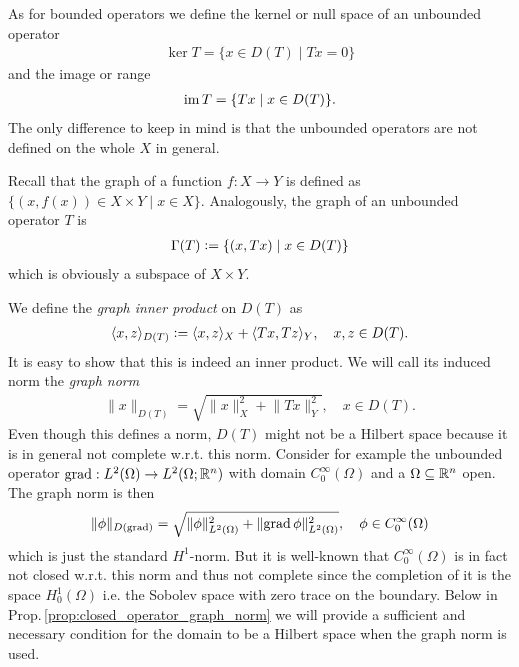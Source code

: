 \documentclass[../master_thesis.tex]{subfiles}
\begin{document}
As for bounded operators we define the kernel or null space of an unbounded
operator 
\begin{align*}
    \ker T = \{ x \in D(T) \mid Tx = 0\}
\end{align*}
and the image or range
\begin{align*}
    \operatorname{im} T = \{ Tx \mid x \in D(T)\}.
\end{align*}
The only difference to keep in mind is that the unbounded operators are not 
defined on the whole $X$ in general.

Recall that the graph of a function $f: X \rightarrow Y$ is defined 
as $\{ (x,f(x)) \in X \times Y \mid x \in X\}$. 
Analogously, the graph of an unbounded operator $T$ is 
\begin{align*}
    \Gamma(T) \vcentcolon= \{ (x,Tx) \mid x \in D(T) \}
\end{align*}
which is obviously a subspace of $X\times Y$.

We define the \textit{graph inner product} on $D(T)$ as 
\begin{align*}
    \langle x,z \rangle _{D(T)} 
    \vcentcolon= \langle x,z \rangle _X + \langle Tx, Tz \rangle _Y,
    \quad x,z \in D(T).
\end{align*}
It is easy to show that this is indeed an inner product. We will call its 
induced norm the \textit{graph norm}
\begin{align*}
    \lVert x \rVert _{D(T)} = \sqrt{ \lVert x \rVert^2 _X + \lVert Tx \rVert ^2 _Y}
    , \quad x\in D(T).
\end{align*}
Even though this defines a norm, $D(T)$ might not be a Hilbert space 
because it is in general not complete w.r.t. this norm. Consider for example 
the unbounded operator $\operatorname{grad}: L^2(\Omega) \rightarrow L^2(\Omega;\mathbb{R}^n)$ with 
domain $C_0^\infty(\Omega)$ and a $\Omega \subseteq \mathbb{R}^n$ open.
The graph norm is then 
\begin{align*}
    \lVert \phi \rVert _{D(\operatorname{grad})} 
    = \sqrt{ \lVert \phi \rVert^2 _{L^2(\Omega)} + \lVert \operatorname{grad} \phi \rVert^2 
        _{L^2(\Omega)}}
        , \quad \phi \in C_0^\infty(\Omega)
\end{align*}
which is just the standard $H^1$-norm.
But it is well-known that $C_0^\infty(\Omega)$ is in fact not closed 
w.r.t. this norm and thus not complete 
since the completion of it is the space $H^1_0(\Omega)$ i.e. 
the Sobolev space with zero trace on the boundary. 
Below in Prop.\,\ref{prop:closed_operator_graph_norm} we will provide a
sufficient and necessary condition for the domain to be a Hilbert space 
when the graph norm is used. 
\end{document}
